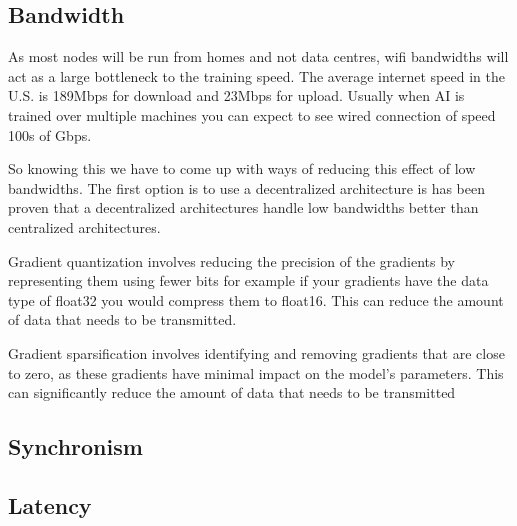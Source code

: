 \documentclass[11pt]{article}
\begin{document}
\subsection{Bandwidth}
As most nodes will be run from homes and not data centres, wifi bandwidths will act as a large bottleneck to the training speed. The average internet speed in the U.S. is 189Mbps for download and 23Mbps for upload. Usually when AI is trained over multiple machines you can expect to see wired connection of speed 100s of Gbps.

So knowing this we have to come up with ways of reducing this effect of low bandwidths. The first option is to use a decentralized architecture is has been proven that a decentralized architectures handle low bandwidths better than centralized architectures. 

Gradient quantization involves reducing the precision of the gradients by representing them using fewer bits for example if your gradients have the data type of float32 you would compress them to float16. This can reduce the amount of data that needs to be transmitted.

Gradient sparsification involves identifying and removing gradients that are close to zero, as these gradients have minimal impact on the model's parameters. This can significantly reduce the amount of data that needs to be transmitted


\subsection{Synchronism}

\subsection{Latency}



\end{document}
